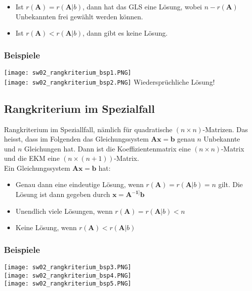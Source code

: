 \documentclass[../main.tex]{subfiles}
\begin{document}
\begin{itemize}
    \item Ist $r(\mathbf{A})=r(\mathbf{A}|b)$, dann hat das GLS eine Lösung, wobei $n-r(\mathbf{A})$ Unbekannten frei gewählt werden können.
    \item Ist $r(\mathbf{A})<r(\mathbf{A}|b)$, dann gibt es keine Lösung.
\end{itemize}

\subsubsection{Beispiele}
\texttt{[image: sw02\_rangkriterium\_bsp1.PNG]} \\ [7pt]
\texttt{[image: sw02\_rangkriterium\_bsp2.PNG]}
Wiedersprüchliche Lösung!

\subsection{Rangkriterium im Spezialfall}
Rangkriterium im Speziallfall, nämlich für quadratische $(n\times n)$-Matrizen. 
Das heisst, dass im Folgenden das Gleichungssystem $\mathbf{Ax}=\mathbf{b}$ genau $n$ Unbekannte und $n$ Gleichungen hat.
Dann ist die Koeffizientenmatrix eine $(n\times n)$-Matrix und die EKM eine $(n\times (n+1))$-Matrix. \\
Ein Gleichungssystem $\mathbf{Ax}=\mathbf{b}$ hat:
\begin{itemize}
    \item Genau dann eine eindeutige Lösung, wenn $r(\mathbf{A})=r(\mathbf{A}|b)=n$ gilt. Die Lösung ist dann gegeben durch $\mathbf{x}=\mathbf{A^{-1]}b}$
    \item Unendlich viele Lösungen, wenn $r(\mathbf{A})=r(\mathbf{A}|b)<n$
    \item Keine Lösung, wenn $r(\mathbf{A})<r(\mathbf{A}|b)$
\end{itemize}

\subsubsection{Beispiele}
\texttt{[image: sw02\_rangkriterium\_bsp3.PNG]} \\ [7pt]
\texttt{[image: sw02\_rangkriterium\_bsp4.PNG]} \\
\texttt{[image: sw02\_rangkriterium\_bsp5.PNG]}
\end{document}
